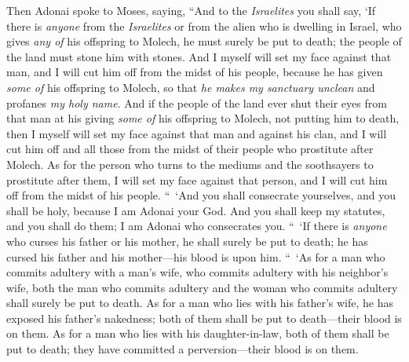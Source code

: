 \begin{biblechapter} %
 Then Adonai spoke to Moses, saying,
\verse “And to the \textit{Israelites} you shall say, ‘If there is \textit{anyone} from the \textit{Israelites} or from the alien who is dwelling in Israel, who gives \textit{any of} his offspring to Molech, he must surely be put to death; the people of the land must stone him with stones.
\verse And I myself will set my face against that man, and I will cut him off from the midst of his people, because he has given \textit{some of} his offspring to Molech, so that \textit{he makes my sanctuary unclean} and profanes \textit{my holy name}.
\verse And if the people of the land ever shut their eyes from that man at his giving \textit{some of} his offspring to Molech, not putting him to death,
\verse then I myself will set my face against that man and against his clan, and I will cut him off and all those from the midst of their people who prostitute after Molech.
\verse As for the person who turns to the mediums and the soothsayers to prostitute after them, I will set my face against that person, and I will cut him off from the midst of his people.
\verse “ ‘And you shall consecrate yourselves, and you shall be holy, because I am Adonai your God.
\verse And you shall keep my statutes, and you shall do them; I am Adonai who consecrates you.
 “ ‘If there is \textit{anyone} who curses his father or his mother, he shall surely be put to death; he has cursed his father and his mother—his blood is upon him.
\verse “ ‘As for a man who commits adultery with a man’s wife, who commits adultery with his neighbor’s wife, both the man who commits adultery and the woman who commits adultery shall surely be put to death.
\verse As for a man who lies with his father’s wife, he has exposed his father’s nakedness; both of them shall be put to death—their blood is on them.
\verse As for a man who lies with his daughter-in-law, both of them shall be put to death; they have committed a perversion—their blood is on them.

\end{biblechapter}
